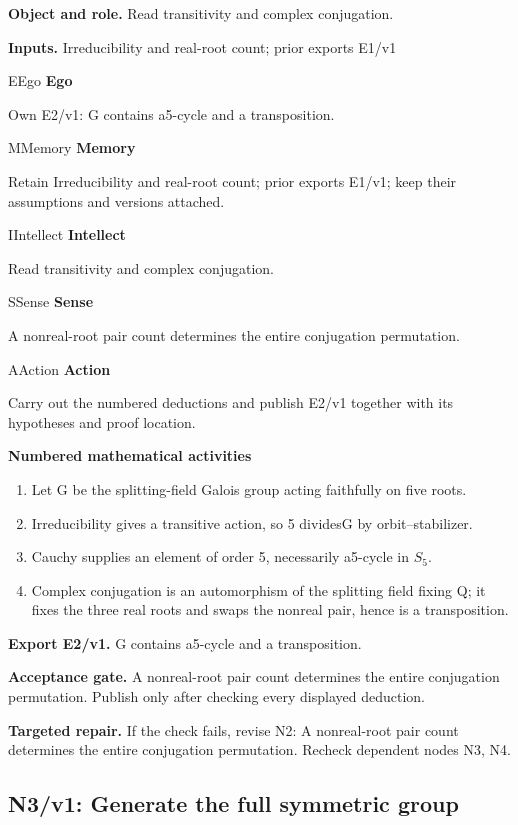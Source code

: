 \documentclass[preprint,12pt,aps,pra,showkeys,amsmath,amssymb,superscriptaddress,floatfix]{revtex4-2}
\theoremstyle{definition}
\theoremstyle{remark}
\newcommand{\mmfaculty}[3]{%
 \begin{mmfacultybox}{#1}{#2}
 {\sffamily\bfseries\color{MMBlue}#2}\par\smallskip #3
 \end{mmfacultybox}}
\newcommand{\field}[2]{\par\smallskip\noindent\textbf{#1.} #2\par}
\begin{document}
\field{Object and role}{Read transitivity and complex conjugation.}

\field{Inputs}{Irreducibility and real-root count; prior exports E1/v1}

\mmfaculty{E}{Ego}{Own E2/v1: G contains a5-cycle and a transposition.}

\mmfaculty{M}{Memory}{Retain Irreducibility and real-root count; prior exports E1/v1; keep
their assumptions and versions attached.}

\mmfaculty{I}{Intellect}{Read transitivity and complex conjugation.}

\mmfaculty{S}{Sense}{A nonreal-root pair count determines the entire conjugation permutation.}

\mmfaculty{A}{Action}{Carry out the numbered deductions and publish E2/v1 together with its
hypotheses and proof location.}

\smallskip\noindent\textbf{Numbered mathematical activities}

\begin{enumerate}[label=N2.\arabic*,leftmargin=3.4em]

\item Let G be the splitting-field Galois group acting faithfully on five
roots.

\item Irreducibility gives a transitive action, so 5
divides\textbar G\textbar{} by orbit--stabilizer.

\item Cauchy supplies an element of order 5, necessarily a5-cycle in
\(S_{5}\).

\item Complex conjugation is an automorphism of the splitting field fixing Q;
it fixes the three real roots and swaps the nonreal pair, hence is a
transposition.

\end{enumerate}

\field{Export E2/v1}{G contains a5-cycle and a transposition.}

\field{Acceptance gate}{A nonreal-root pair count determines the entire conjugation permutation.
Publish only after checking every displayed deduction.}

\field{Targeted repair}{If the check fails, revise N2: A nonreal-root pair count determines the
entire conjugation permutation. Recheck dependent nodes N3, N4.}

\clearpage

\subsection{N3/v1: Generate the full symmetric group}
\end{document}
